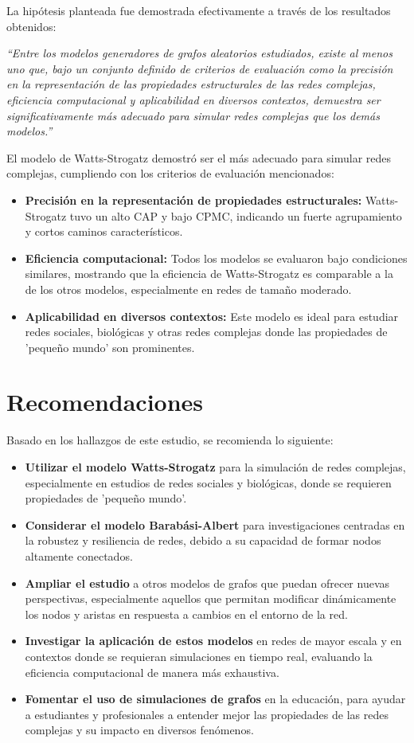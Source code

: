 \documentclass[12pt]{book}
\begin{document}
La hipótesis planteada fue demostrada efectivamente a través de los resultados obtenidos:

\textit{``Entre los modelos generadores de grafos aleatorios estudiados, existe al menos uno que, bajo un conjunto definido de criterios de evaluación como la precisión en la representación de las propiedades estructurales de las redes complejas, eficiencia computacional y aplicabilidad en diversos contextos, demuestra ser significativamente más adecuado para simular redes complejas que los demás modelos.''}

El modelo de Watts-Strogatz demostró ser el más adecuado para simular redes complejas, cumpliendo con los criterios de evaluación mencionados:
\begin{itemize}
    \item \textbf{Precisión en la representación de propiedades estructurales:} Watts-Strogatz tuvo un alto CAP y bajo CPMC, indicando un fuerte agrupamiento y cortos caminos característicos.
    \item \textbf{Eficiencia computacional:} Todos los modelos se evaluaron bajo condiciones similares, mostrando que la eficiencia de Watts-Strogatz es comparable a la de los otros modelos, especialmente en redes de tamaño moderado.
    \item \textbf{Aplicabilidad en diversos contextos:} Este modelo es ideal para estudiar redes sociales, biológicas y otras redes complejas donde las propiedades de 'pequeño mundo' son prominentes.
\end{itemize}

\section{Recomendaciones}

Basado en los hallazgos de este estudio, se recomienda lo siguiente:

\begin{itemize}
    \item \textbf{Utilizar el modelo Watts-Strogatz} para la simulación de redes complejas, especialmente en estudios de redes sociales y biológicas, donde se requieren propiedades de 'pequeño mundo'.
    \item \textbf{Considerar el modelo Barabási-Albert} para investigaciones centradas en la robustez y resiliencia de redes, debido a su capacidad de formar nodos altamente conectados.
    \item \textbf{Ampliar el estudio} a otros modelos de grafos que puedan ofrecer nuevas perspectivas, especialmente aquellos que permitan modificar dinámicamente los nodos y aristas en respuesta a cambios en el entorno de la red.
    \item \textbf{Investigar la aplicación de estos modelos} en redes de mayor escala y en contextos donde se requieran simulaciones en tiempo real, evaluando la eficiencia computacional de manera más exhaustiva.
    \item \textbf{Fomentar el uso de simulaciones de grafos} en la educación, para ayudar a estudiantes y profesionales a entender mejor las propiedades de las redes complejas y su impacto en diversos fenómenos.
\end{itemize}
\end{document}

